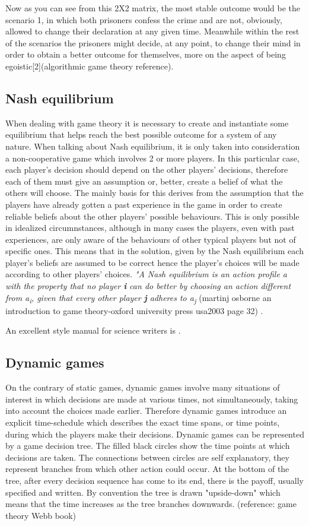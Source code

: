 \documentclass[conference]{IEEEtran}
\begin{document}
Now as you can see from this 2X2 matrix, the most stable outcome would be the scenario 1, in which both prisoners confess the crime and are not, obviously, allowed to change their declaration at any given time. Meanwhile within the rest of the scenarios the prisoners might decide, at any point, to change their mind in order to obtain a better outcome for themselves, more on the aspect of being egoistic[2](algorithmic game theory reference).


\subsection{Nash equilibrium}
When dealing with game theory it is necessary to create and instantiate some equilibrium that helps reach the best possible outcome for a system of any nature. When talking about Nash equilibrium, it is only taken into consideration a non-cooperative game which involves 2 or more players. In this particular case, each player's decision should depend on the other players' decisions, therefore each of them must give an assumption or, better, create a belief of what the others will choose. The mainly basis for this derives from the assumption that the players have already gotten a past experience in the game in order to create reliable beliefs about the other players' possible behaviours.
This is only possible in idealized circumnstances, although in many cases the players, even with past experiences, are only aware of the behaviours of other typical players but not of specific ones. This means that in the solution, given by the Nash equilibrium each player's beliefs are assumed to be correct hence the player's choices will be made according to other players' choices. 
\textit{"A Nash equilibrium is an action profile a\textsuperscript{\text{*}} with the property that no player \textbf{i} can do better by choosing an action different from a\textsuperscript{\text{*}}\textsubscript{i}, given that every other player \textbf{j} adheres to a\textsuperscript{\text{*}}\textsubscript{j} }
(martinj osborne an introduction to game theory-oxford university press usa2003 page 32) .

An excellent style manual for science writers is \cite{b7}.

\subsection{Dynamic games}
On the contrary of static games, dynamic games involve many situations of interest in which decisions are
made at various times, not simultaneously, taking into account the choices made earlier. Therefore dynamic games introduce an explicit time-schedule which describes the exact time spans, or time points, during which the players make their decisions.
Dynamic games can be represented by a game decision tree. The filled black circles show the time points at which decisions are taken. The connections between circles are self explanatory, they represent branches from which other action could occur. At the bottom of the tree, after every decision sequence has come to its end, there is the payoff, usually specified and written. By convention the tree is drawn "upside-down" which means that the time increases as the tree branches downwards. (reference: game theory Webb book)
\end{document}
